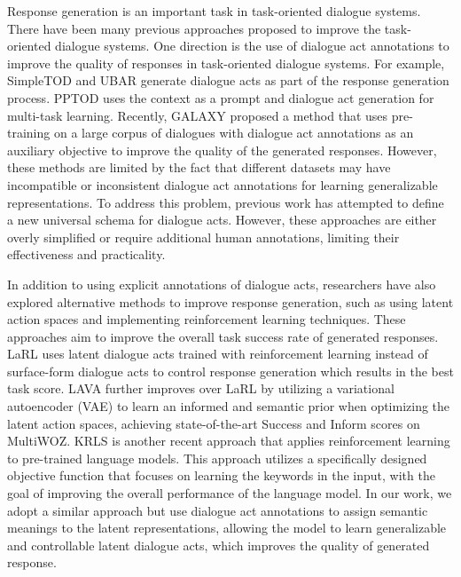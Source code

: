 Response generation is an important task in task-oriented dialogue systems. There have been many previous approaches \cite{HosseiniAsl2020ASL,DBLP:conf/eacl/WuZLY21,DBLP:conf/acl/GuWWSY20,DBLP:conf/acl/SuSMG0LZ22,he2022galaxy,https://doi.org/10.48550/arxiv.2211.16773,DBLP:journals/corr/abs-2210-08917,DBLP:journals/corr/abs-2305-13710} proposed to improve the task-oriented dialogue systems.
One direction is the use of dialogue act annotations to improve the quality of responses in task-oriented dialogue systems. 
For example, SimpleTOD \cite{HosseiniAsl2020ASL} and UBAR \cite{DBLP:conf/aaai/YangLQ21} generate dialogue acts as part of the response generation process. 
PPTOD \cite{DBLP:conf/acl/SuSMG0LZ22} uses the context as a prompt and dialogue act generation for multi-task learning. 
Recently, GALAXY \cite{he2022galaxy} proposed a method that uses pre-training on a large corpus of dialogues with dialogue act annotations as an auxiliary objective to improve the quality of the generated responses.
However, these methods are limited by the fact that different datasets may have incompatible or inconsistent dialogue act annotations for learning generalizable representations.
To address this problem, previous work \cite{he2022galaxy,DBLP:conf/interspeech/PaulGH19} has attempted to define a new universal schema for dialogue acts. 
However, these approaches are either overly simplified or require additional human annotations, limiting their effectiveness and practicality.

In addition to using explicit annotations of dialogue acts, researchers have also explored alternative methods to improve response generation, such as using latent action spaces and implementing reinforcement learning techniques.
These approaches aim to improve the overall task success rate of generated responses.
LaRL \cite{zhao2019rethinking} uses latent dialogue acts trained with reinforcement learning instead of surface-form dialogue acts to control response generation which results in the best task score. 
LAVA \cite{lubis2020lava} further improves over LaRL by utilizing a variational autoencoder (VAE) to learn an informed and semantic prior when optimizing the latent action spaces, achieving state-of-the-art Success and Inform scores on MultiWOZ.
KRLS \cite{https://doi.org/10.48550/arxiv.2211.16773} is another recent approach that applies reinforcement learning to pre-trained language models.
This approach utilizes a specifically designed objective function that focuses on learning the keywords in the input, with the goal of improving the overall performance of the language model.
In our work, we adopt a similar approach but use dialogue act annotations to assign semantic meanings to the latent representations, allowing the model to learn generalizable and controllable latent dialogue acts, which improves the quality of generated response.

